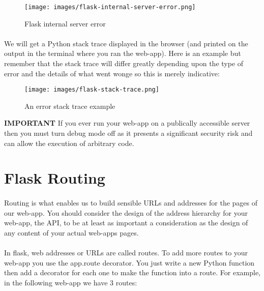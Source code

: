 \documentclass[12pt, a4paper, twoside]{book}
\begin{document}
\begin{figure}[H]
\centering
\texttt{[image: images/flask-internal-server-error.png]}
\caption{Flask internal server error}
\label{fig:flask-internal-server-error}
\end{figure}
 \paragraph{} We will get a Python stack trace displayed in the browser (and printed on the output in the terminal where you ran the web-app). Here is an example but remember that the stack trace will differ greatly depending upon the type of error and the details of what went wonge so this is merely indicative:

\begin{figure}[H]
\centering
\texttt{[image: images/flask-stack-trace.png]}
\caption{An error stack trace example}
\label{fig:flask-stack-trace}
\end{figure}


\begin{framed}
\textbf{IMPORTANT} If you ever run your web-app on a publically accessible server then you must turn debug mode off as it presents a significant security risk and can allow the execution of arbitrary code.
\end{framed}

\section{Flask Routing}
\label{routing}
\paragraph{} Routing is what enables us to build sensible URLs and addresses for the pages of our web-app. You should consider the design of the address hierarchy for your web-app, the API, to be at least as important a consideration as the design of any content of your actual web-apps pages.

\paragraph{} In flask, web addresses or URLs are called routes. To add more routes to your web-app you use the app.route decorator. You just write a new Python function then add a decorator for each one to make the function into a route. For example, in the following web-app we have 3 routes:
\end{document}
